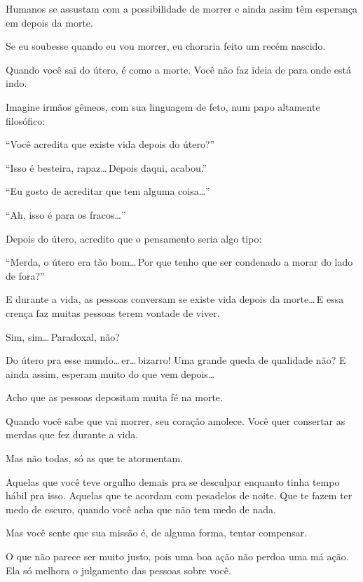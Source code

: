Humanos se assustam com a possibilidade de morrer e ainda assim têm esperança em depois da morte.

Se eu soubesse quando eu vou morrer, eu choraria feito um recém nascido.

Quando você sai do útero, é como a morte. Você não faz ideia de para onde está indo.

\begin{sloppypar}
Imagine irmãos gêmeos, com sua linguagem de feto, num papo altamente filosófico:
\end{sloppypar}

``Você acredita que existe vida depois do útero?''

``Isso é besteira, rapaz\ldots\,Depois daqui, acabou.''

``Eu gosto de acreditar que tem alguma coisa\ldots''

``Ah, isso é para os fracos\ldots''

Depois do útero, acredito que o pensamento seria algo tipo:

``Merda, o útero era tão bom\ldots\,Por que tenho que ser condenado a morar do lado de fora?''

E durante a vida, as pessoas conversam se existe vida depois da morte\ldots\,E essa crença faz muitas pessoas terem vontade de viver.

Sim, sim\ldots\,Paradoxal, não?

\begin{sloppypar}
Do útero pra esse mundo\ldots\,er\ldots\,bizarro! Uma grande queda de qualidade não? E ainda assim, esperam muito do que vem depois\ldots
\end{sloppypar}

Acho que as pessoas depositam muita fé na morte.

Quando você sabe que vai morrer, seu coração amolece. Você quer consertar as merdas que fez durante a vida.

Mas não todas, só as que te atormentam.

Aquelas que você teve orgulho demais pra se desculpar enquanto tinha tempo hábil pra isso. Aquelas que te acordam com pesadelos de noite. Que te fazem ter medo de escuro, quando você acha que não tem medo de nada.

Mas você sente que sua missão é, de alguma forma, tentar compensar.

O que não parece ser muito justo, pois uma boa ação não perdoa uma má ação. Ela só melhora o julgamento das pessoas sobre você.

